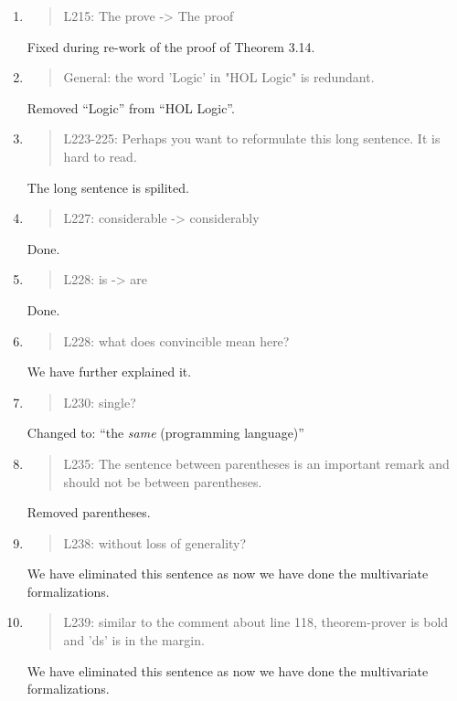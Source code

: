 \begin{enumerate}
\item \begin{quote}
    L215: The prove -> The proof
  \end{quote}
  Fixed during re-work of the proof of Theorem 3.14.
  
\item \begin{quote}
    General: the word 'Logic' in "HOL Logic" is redundant.
  \end{quote}
  Removed ``Logic'' from ``HOL Logic''.
  
\item \begin{quote}
    L223-225: Perhaps you want to reformulate this long sentence. It is hard to read.
  \end{quote}
  The long sentence is spilited.
  
\item \begin{quote}
    L227: considerable -> considerably
  \end{quote}
  Done.
 
\item \begin{quote}
    L228: is -> are
  \end{quote}
  Done.
  
\item \begin{quote}
    L228: what does convincible mean here?
  \end{quote}
  We have further explained it.
  
\item \begin{quote}
    L230: single?
  \end{quote}
  Changed to: ``the \emph{same} (programming language)''
  
\item \begin{quote}
    L235: The sentence between parentheses is an important remark and
    should not be between parentheses.
  \end{quote}
  Removed parentheses.
  
\item \begin{quote}
    L238: without loss of generality?
  \end{quote}
  We have eliminated this sentence as now we have done the
  multivariate formalizations.
  
\item \begin{quote}
    L239: similar to the comment about line 118, theorem-prover is
    bold and 'ds' is in the margin.
  \end{quote}
  We have eliminated this sentence as now we have done the
  multivariate formalizations.
  

\end{enumerate}
